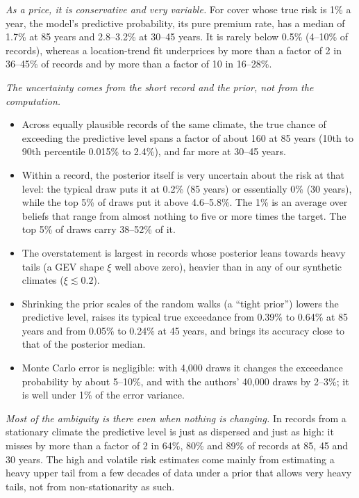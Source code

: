 \documentclass[11pt]{article}
\begin{document}
\emph{As a price, it is conservative and very variable.} For cover whose true risk is 1\% a year,
the model's predictive probability, its pure premium rate, has a median of 1.7\% at 85 years and
2.8--3.2\% at 30--45 years. It is rarely below 0.5\% (4--10\% of records), whereas a location-trend
fit underprices by more than a factor of 2 in 36--45\% of records and by more than a factor of 10
in 16--28\%.

\emph{The uncertainty comes from the short record and the prior, not from the computation.}
\begin{itemize}\setlength{\itemsep}{1pt}
\item Across equally plausible records of the same climate, the true chance of exceeding the
  predictive level spans a factor of about 160 at 85 years (10th to 90th percentile 0.015\% to
  2.4\%), and far more at 30--45 years.
\item Within a record, the posterior itself is very uncertain about the risk at that level: the
  typical draw puts it at 0.2\% (85 years) or essentially 0\% (30 years), while the top 5\% of
  draws put it above 4.6--5.8\%. The 1\% is an average over beliefs that range from almost nothing
  to five or more times the target. The top 5\% of draws carry 38--52\% of it.
\item The overstatement is largest in records whose posterior leans towards heavy tails (a
  GEV shape $\xi$ well above zero), heavier than in any of our synthetic climates
  ($\xi\lesssim0.2$).
\item Shrinking the prior scales of the random walks (a ``tight prior'') lowers the predictive
  level, raises its typical true exceedance from 0.39\% to 0.64\% at 85 years and from 0.05\% to
  0.24\% at 45 years, and brings its accuracy close to that of the posterior median.
\item Monte Carlo error is negligible: with 4,000 draws it changes the exceedance probability by
  about 5--10\%, and with the authors' 40,000 draws by 2--3\%; it is well under 1\% of the error
  variance.
\end{itemize}

\emph{Most of the ambiguity is there even when nothing is changing.} In records from a stationary
climate the predictive level is just as dispersed and just as high: it misses by more than a factor
of 2 in 64\%, 80\% and 89\% of records at 85, 45 and 30 years. The high and volatile risk
estimates come mainly from estimating a heavy upper tail from a few decades of data under a prior
that allows very heavy tails, not from non-stationarity as such.
\end{document}
